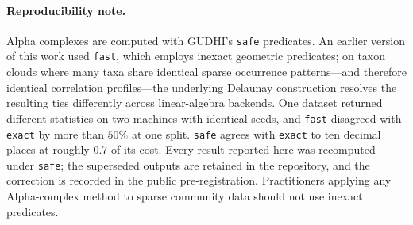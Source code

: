 \documentclass[review,12pt,authoryear]{elsarticle}
\theoremstyle{remark}
\begin{document}
\paragraph{Reproducibility note.} Alpha complexes are computed with GUDHI's
\texttt{safe} predicates. An earlier version of this work used
\texttt{fast}, which employs inexact geometric predicates; on taxon clouds
where many taxa share identical sparse occurrence patterns---and therefore
identical correlation profiles---the underlying Delaunay construction
resolves the resulting ties differently across linear-algebra backends. One
dataset returned different statistics on two machines with identical seeds,
and \texttt{fast} disagreed with \texttt{exact} by more than $50\%$ at one
split. \texttt{safe} agrees with \texttt{exact} to ten decimal places at
roughly $0.7$ of its cost. Every result reported here was recomputed under
\texttt{safe}; the superseded outputs are retained in the repository, and
the correction is recorded in the public pre-registration. Practitioners
applying any Alpha-complex method to sparse community data should not use
inexact predicates.



\end{document}

